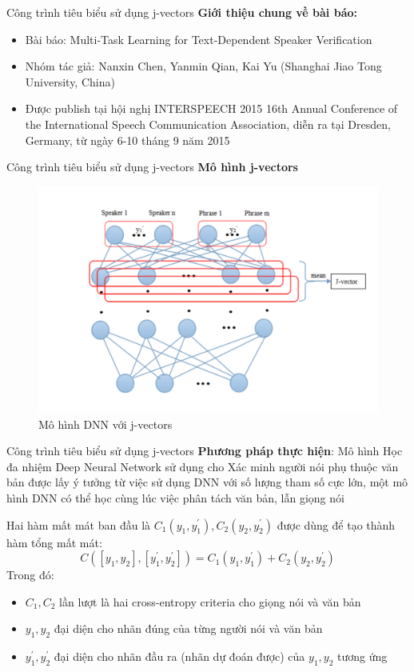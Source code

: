 \documentclass[notheorems, aspectratio=54]{beamer}
\begin{document}
\begin{frame}{Công trình tiêu biểu sử dụng j-vectors}
	\textbf{Giới thiệu chung về bài báo:}
	\begin{itemize}
		\item Bài báo: Multi-Task Learning for Text-Dependent Speaker Verification
		\item Nhóm tác giả: Nanxin Chen, Yanmin Qian, Kai Yu (Shanghai Jiao Tong University, China)
		\item Được publish tại hội nghị INTERSPEECH 2015 16th Annual Conference of the International Speech Communication Association, diễn ra tại Dresden, Germany, từ ngày 6-10 tháng 9 năm 2015
	\end{itemize}
\end{frame}
\begin{frame}{Công trình tiêu biểu sử dụng j-vectors}
	\textbf{Mô hình j-vectors}
	\begin{figure}[H]
		\includegraphics[width=0.7\linewidth]{images/j-vectors.png}
		\caption{Mô hình DNN với j-vectors}
		\label{fig:writing-thesis}
	\end{figure}
\end{frame}
\begin{frame}{Công trình tiêu biểu sử dụng j-vectors}
	\textbf{Phương pháp thực hiện}: Mô hình Học đa nhiệm Deep Neural Network sử dụng cho Xác minh người nói phụ thuộc văn bản được lấy ý tưởng từ việc sử dụng DNN với số lượng tham số cực lớn, một mô hình DNN có thể học cùng lúc việc phân tách văn bản, lẫn giọng nói
	
	Hai hàm mất mát ban đầu là $C_1(y_1, y_1^{'}), C_2(y_2, y_2^{'})$ được dùng để tạo thành hàm tổng mất mát:
	$$C([y_1, y_2], [y_1^{'}, y_2^{'}]) = C_1(y_1, y_1^{'}) + C_2(y_2, y_2^{'})$$
	Trong đó:
	\begin{itemize}
		\item $C_1, C_2$ lần lượt là hai cross-entropy criteria cho giọng nói và văn bản
		\item $y_1, y_2$ đại diện cho nhãn đúng của từng người nói và văn bản
		\item $y_1^{'}, y_2^{'}$ đại diện cho nhãn đầu ra (nhãn dự đoán được) của $y_1, y_2$ tương ứng
	\end{itemize}
\end{frame}
\end{document}
